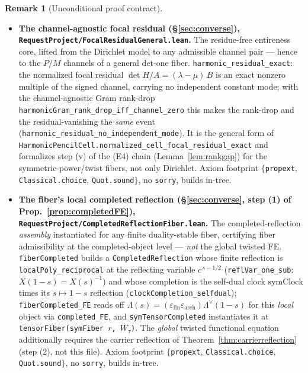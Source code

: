\documentclass[11pt]{article}
\theoremstyle{definition}
\newtheorem{remark}[theorem]{Remark}
\begin{document}
\begin{remark}[Unconditional proof contract]
\begin{enumerate}
\begin{itemize}
\item \textbf{The channel-agnostic focal residual (\S\ref{sec:converse}),
\texttt{RequestProject/FocalResidualGeneral.lean}.} The residue-free entireness core, lifted from the
Dirichlet model to any admissible channel pair --- hence to the $P/M$ channels of a general det-one fiber.
\texttt{harmonic\_residual\_exact}: the normalized focal residual $\det H/A=(\lambda-\mu)\,B$ is an exact
nonzero multiple of the signed channel, carrying no independent constant mode; with the channel-agnostic Gram
rank-drop \texttt{harmonicGram\_rank\_drop\_iff\_channel\_zero} this makes the rank-drop and the
residual-vanishing the \emph{same} event (\texttt{harmonic\_residual\_no\_independent\_mode}). It is the
general form of \texttt{HarmonicPencilCell.normalized\_cell\_focal\_residual\_exact} and formalizes step
\textup{(v)} of the \textup{(E4)} chain (Lemma~\ref{lem:rankgap}) for the symmetric-power/twist fibers, not
only Dirichlet. Axiom footprint $\{$\texttt{propext}, \texttt{Classical.choice}, \texttt{Quot.sound}$\}$, no
\texttt{sorry}, builds in-tree.

\item \textbf{The fiber's local completed reflection (\S\ref{sec:converse}, step (1) of
Prop.~\ref{prop:completedFE}), \texttt{RequestProject/CompletedReflectionFiber.lean}.} The completed-reflection
\emph{assembly} instantiated for any finite duality-stable fiber, certifying fiber admissibility at the
completed-object level --- \emph{not} the global twisted FE. \texttt{fiberCompleted} builds a
\texttt{CompletedReflection} whose finite reflection is \texttt{localPoly\_reciprocal} at the reflecting
variable $c^{\,s-1/2}$ (\texttt{reflVar\_one\_sub}: $X(1-s)=X(s)^{-1}$) and whose completion is the self-dual
clock $\mathrm{symClock}$ times its $s\mapsto1-s$ reflection (\texttt{clockCompletion\_selfdual});
\texttt{fiberCompleted\_FE} reads off $\Lambda(s)=(\varepsilon_{\mathrm{fin}}\varepsilon_{\mathrm{arch}})\Lambda^\vee(1-s)$
for this \emph{local} object via \texttt{completed\_FE}, and \texttt{symTensorCompleted} instantiates it at
\texttt{tensorFiber(symFiber\,$r$,\,$W_\tau$)}. The \emph{global} twisted functional equation additionally
requires the carrier reflection of Theorem~\ref{thm:carrierreflection} (step (2), not this file). Axiom
footprint $\{$\texttt{propext}, \texttt{Classical.choice}, \texttt{Quot.sound}$\}$, no \texttt{sorry}, builds
in-tree.


\end{itemize}
\end{enumerate}
\end{remark}
\end{document}
